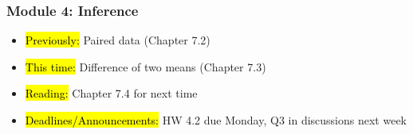 
\begin{frame}
    \frametitle{Module 4: Inference}
    \begin{itemize}
        \item \hl{Previously: }Paired data (Chapter 7.2)
        \item \hl{This time: }Difference of two means (Chapter 7.3)
        \item \hl{Reading: }Chapter 7.4 for next time
        \item \hl{Deadlines/Announcements: }HW 4.2 due Monday, Q3 in discussions next week
    \end{itemize}
    
\end{frame}